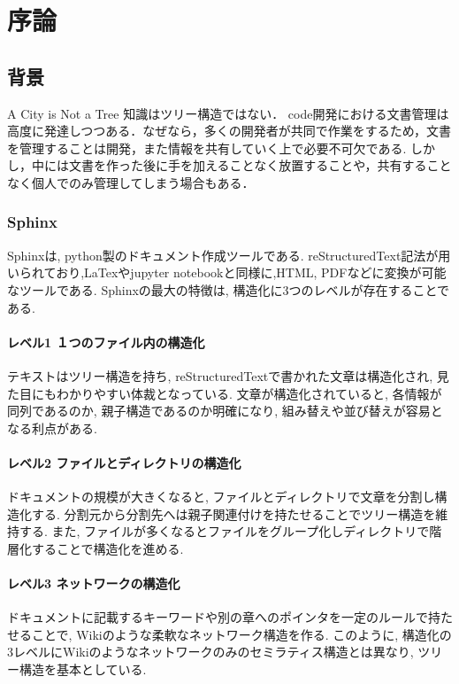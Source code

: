 \documentclass[11pt]{article}
\date{}
\title{}
\begin{document}
\setcounter{tocdepth}{3}
\tableofcontents


\section{序論}
\label{sec:orga5fc43d}
\subsection{背景}
\label{sec:org2c0cb16}
A City is Not a Tree
知識はツリー構造ではない．
code開発における文書管理は高度に発達しつつある．なぜなら，多くの開発者が共同で作業をするため，文書を管理することは開発，また情報を共有していく上で必要不可欠である.
しかし，中には文書を作った後に手を加えることなく放置することや，共有することなく個人でのみ管理してしまう場合もある．


\subsubsection{Sphinx}
\label{sec:org46bbe60}
Sphinxは, python製のドキュメント作成ツールである. reStructuredText記法が用いられており,LaTexやjupyter notebookと同様に,HTML, PDFなどに変換が可能なツールである.
Sphinxの最大の特徴は, 構造化に3つのレベルが存在することである.

\paragraph{レベル1 １つのファイル内の構造化}
\label{sec:orga48b90e}
テキストはツリー構造を持ち, reStructuredTextで書かれた文章は構造化され, 見た目にもわかりやすい体裁となっている.
文章が構造化されていると, 各情報が同列であるのか, 親子構造であるのか明確になり, 組み替えや並び替えが容易となる利点がある.

\paragraph{レベル2 ファイルとディレクトリの構造化}
\label{sec:org7dc4f6f}
ドキュメントの規模が大きくなると, ファイルとディレクトリで文章を分割し構造化する. 分割元から分割先へは親子関連付けを持たせることでツリー構造を維持する.
また, ファイルが多くなるとファイルをグループ化しディレクトリで階層化することで構造化を進める.

\paragraph{レベル3 ネットワークの構造化}
\label{sec:org48145d6}
ドキュメントに記載するキーワードや別の章へのポインタを一定のルールで持たせることで, Wikiのような柔軟なネットワーク構造を作る.
このように, 構造化の3レベルにWikiのようなネットワークのみのセミラティス構造とは異なり, ツリー構造を基本としている.
\end{document}

